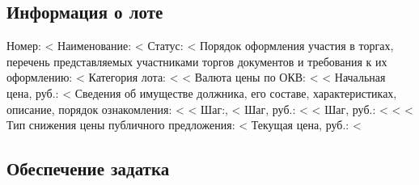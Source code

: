 \documentclass[a4paper,12pt]{article}
\begin{document}
{{{{{{{	\subsection*{Информация о лоте}
	{\color{Gray} Номер:} <%
	\linebreak
	{\color{Gray} Наименование:} <%
	\linebreak
	{\color{Gray} Статус:} <%
	\linebreak
	{\color{Gray} Порядок оформления участия в торгах, перечень представляемых участниками торгов документов и требования к их оформлению:} <%
	\linebreak
	{\color{Gray} Категория лота:} <%
	\linebreak
	<%
		{\color{Gray} Валюта цены по ОКВ:} <%
		\linebreak
	<%
	{\color{Gray} Начальная цена, руб.:} <%
	\linebreak
	{\color{Gray} Сведения об имуществе должника, его составе, характеристиках, описание, порядок ознакомления:} <%
	\linebreak
	<%
		{\color{Gray} Шаг:}, %
		\linebreak
		<%
			{\color{Gray} Шаг, руб.:} <%
		<%
			{\color{Gray} Шаг, руб.:} <%
		<%
	\linebreak
	<%
	{\color{Gray} Тип снижения цены публичного предложения:} <%
	\linebreak
	{\color{Gray} Текущая цена, руб.:} <%
	\linebreak



	\subsection*{Обеспечение задатка}

}}}}}}}
\end{document}
